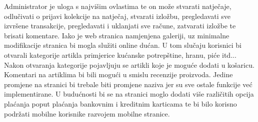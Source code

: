 {		\vspace{3mm}
		\newline Administrator je uloga s najvišim ovlastima te on može stvarati natječaje, odlučivati o prijavi kolekcije na natječaj, stvarati izložbu, pregledavati sve izvršene transakcije,  pregledavati i uklanjati sve račune, zatvarati izložbe te brisati komentare.
		\vspace{3mm}
		\newline Iako je web stranica namjenjena galeriji, uz minimalne modifikacije stranica bi mogla služiti online dućan. U tom slučaju korisnici bi otvarali kategorije artikla primjerice kućanske  potrepštine, hranu, piće itd... Nakon otvaranja kategorije  pojavljuju se artikli koje je moguće dodati u košaricu. Komentari na artiklima bi bili mogući u smislu recenzije proizvoda.	
		Jedine promjene na stranici bi trebale biti promjene naziva jer su sve ostale funkcije već implementirane. 
		\vspace{3mm}
		\newline U budućnosti bi se na stranici moglo dodati više različitih opcija plaćanja poput plaćanja bankovnim i kreditnim karticama te bi bilo korisno podržati mobilne korisnike razvojem  mobilne stranice.
}
		
